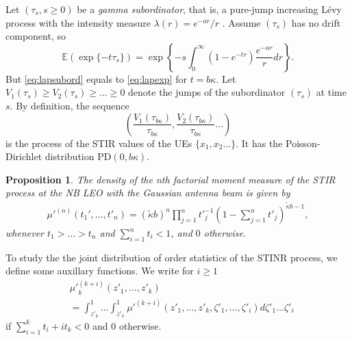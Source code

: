 \documentclass[conference]{IEEEtran}
\theoremstyle{definition}
\theoremstyle{plain}
\newtheorem{prop}[thm4]{Proposition}
\begin{document}
                    
          Let $(\tau_s, s\geq 0)$ be a \textit{gamma subordinator}, that is, a pure-jump increasing Lévy process with the intensity measure $\lambda(r) = e^{-ar}/r$ . Assume $(\tau_s)$ has no drift component, so
          \begin{equation}
            \label{eq:lapsubord}
            \mathbb{E}(\exp\{-t \tau_s\}) = \exp\left\{-s \int_0^{\infty}(1-e^{-t r})\frac{e^{-ar}}{r} dr \right\}.
          \end{equation}
          But \eqref{eq:lapsubord} equals to \eqref{eq:lapexp} for $t=b \kappa$. Let $V_1(\tau_s) \geq V_2(\tau_s)\geq \dots \geq 0 $ denote the jumps of the subordinator $(\tau_s)$ at time $s$. By definition, the sequence
          \begin{equation}
            \left(\frac{V_1(\tau_{b\kappa})}{\tau_{b\kappa}},\frac{V_2(\tau_{b\kappa})}{\tau_{b\kappa}} \dots \right)
          \end{equation}
          is the process of the STIR values of the UEs $\{x_1,x_2 \dots\}$. It has the Poisson-Dirichlet distribution PD$(0, b \kappa)$.
                    



           
          

                    

          

          
          \begin{prop}
            The density of the nth factorial moment measure of the STIR process at the NB LEO with the Gaussian antenna beam is given by
            \begin{align}
              \label{eq:factorialmoment}
              \mu'^{(n)}(t_1',\dots,t'_n) = (\tilde{\kappa}b)^n\prod_{j=1}^n{t'}_{j}^{-1}\left(1- \sum_{j=1}^nt'_j \right)^{\tilde{\kappa}b-1},       
            \end{align}
            whenever $t_1>\dots >t_n$ and $\sum_{i=1}^n t_i <1$, and $0$ otherwise.
          \end{prop}
          To study the the joint distribution of order statistics of the STINR process, we define some auxillary functions. We write for $i\geq 1$
          \begin{align}
            \label{eq:auxillary}
                  &{\mu'}_k^{(k+i)}(z'_1,\dots,z'_k) \nonumber \\
                  &= \int_{z'_k}^1 \dots \int_{z'_k}^1 {\mu'}^{(k+i)}(z'_1,\dots,z'_k,\zeta'_1,\dots,\zeta'_i) d\zeta'_1 \dots \zeta'_i
          \end{align}
           if $\sum_{i=1}^k t_i + it_k <0$ and $0$ otherwise.
\end{document}
